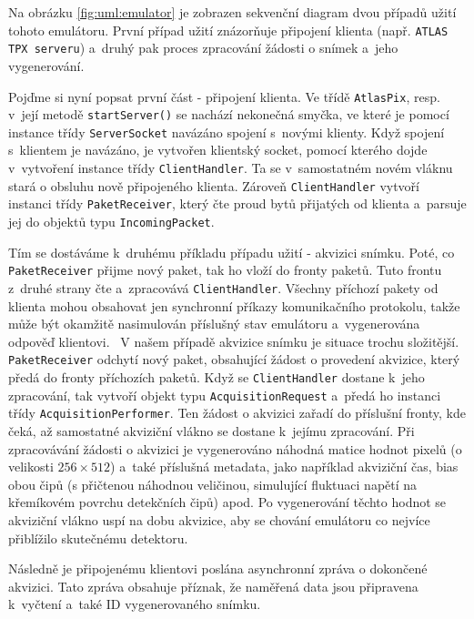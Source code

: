 Na obrázku \ref{fig:uml:emulator} je zobrazen sekvenční diagram dvou případů užití tohoto emulátoru. První případ užití znázorňuje připojení klienta (např. \texttt{ATLAS TPX serveru}) a~druhý pak proces zpracování žádosti o snímek a~jeho vygenerování.

Pojďme si nyní popsat první část - připojení klienta. Ve třídě \texttt{AtlasPix}, resp. v~její metodě \texttt{startServer()} se nachází nekonečná smyčka, ve které je pomocí instance třídy \texttt{ServerSocket} navázáno spojení s~novými klienty. Když spojení s~klientem je navázáno, je vytvořen klientský socket, pomocí kterého dojde v~vytvoření instance třídy \texttt{ClientHandler}. Ta se v~samostatném novém vláknu stará o obsluhu nově připojeného klienta. Zároveň \texttt{ClientHandler} vytvoří instanci třídy \texttt{PaketReceiver}, který čte proud bytů přijatých od klienta a~parsuje jej do objektů typu \texttt{IncomingPacket}.

Tím se dostáváme k~druhému příkladu případu užití - akvizici snímku. Poté, co \\\texttt{PaketReceiver} přijme nový paket, tak ho vloží do fronty paketů. Tuto frontu z~druhé strany čte a~zpracovává \texttt{ClientHandler}. Všechny příchozí pakety od klienta mohou obsahovat jen synchronní příkazy komunikačního protokolu, takže může být okamžitě nasimulován příslušný stav emulátoru a~vygenerována odpověď klientovi. 
\
V našem případě akvizice snímku je situace trochu složitější. \texttt{PaketReceiver} odchytí nový paket, obsahující žádost o provedení akvizice, který předá do fronty příchozích paketů. Když se \texttt{ClientHandler} dostane k~jeho zpracování, tak vytvoří objekt typu \texttt{AcquisitionRequest} a~předá ho instanci třídy \texttt{AcquisitionPerformer}. Ten žádost o akvizici zařadí do příslušní fronty, kde čeká, až samostatné akviziční vlákno se dostane k~jejímu zpracování. Při zpracovávání žádosti o akvizici je vygenerováno náhodná matice hodnot pixelů (o velikosti $256\times512$) a~také příslušná metadata, jako například akviziční čas, bias obou čipů (s přičtenou náhodnou veličinou, simulující fluktuaci napětí na křemíkovém povrchu detekčních čipů) apod. Po vygenerování těchto hodnot se akviziční vlákno uspí na dobu akvizice, aby se chování emulátoru co nejvíce přiblížilo skutečnému detektoru.

Následně je připojenému klientovi poslána asynchronní zpráva o dokončené akvizici. Tato zpráva obsahuje příznak, že naměřená data jsou připravena k~vyčtení a~také ID vygenerovaného snímku. 

